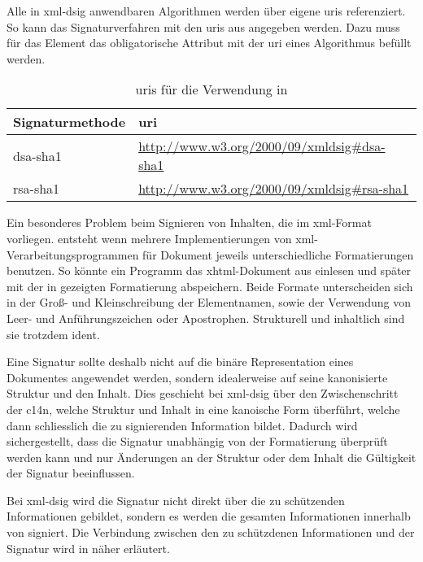 Alle in \gls{xml-dsig} anwendbaren Algorithmen werden über eigene \glspl{uri} referenziert. So kann das Signaturverfahren mit den \glspl{uri} aus
 angegeben werden. Dazu muss für das Element  das obligatorische Attribut
 mit der \gls{uri} eines Algorithmus befüllt werden.

\begin{table}
    \centering
    \begin{tabularx}{\textwidth}{ l X }
        Signaturmethode & \gls{uri} \\
        \hline
        \hline
        \gls{dsa}-\gls{sha1} & \url{http://www.w3.org/2000/09/xmldsig\#dsa-sha1} \\
        \hline
        \gls{rsa}-\gls{sha1} & \url{http://www.w3.org/2000/09/xmldsig\#rsa-sha1} \\
        \hline
    \end{tabularx}
    \caption{\protect\glspl{uri} für die Verwendung in }
    \label{tab:xml-dsig-signature-method-uri}
\end{table}

Ein besonderes Problem beim Signieren von Inhalten, die im \gls{xml}-Format vorliegen. entsteht wenn mehrere Implementierungen von
\gls{xml}-Verarbeitungsprogrammen für Dokument jeweils unterschiedliche Formatierungen benutzen. So könnte ein Programm das \gls{xhtml}-Dokument aus
 einlesen und später mit der in  gezeigten Formatierung abspeichern. Beide Formate unterscheiden sich
in der Groß- und Kleinschreibung der Elementnamen, sowie der Verwendung von Leer- und Anführungszeichen oder Apostrophen. Strukturell und inhaltlich sind sie
trotzdem ident.

Eine Signatur sollte deshalb nicht auf die binäre Representation eines Dokumentes angewendet werden, sondern idealerweise auf seine kanonisierte
Struktur und den Inhalt. Dies geschieht bei \gls{xml-dsig} über den Zwischenschritt der \gls{c14n}, welche Struktur und Inhalt in eine kanoische Form überführt,
welche dann schliesslich die zu signierenden Information bildet. Dadurch wird sichergestellt, dass die Signatur unabhängig von der Formatierung überprüft werden
kann und nur Änderungen an der Struktur oder dem Inhalt die Gültigkeit der Signatur beeinflussen. 

Bei \gls{xml-dsig} wird die Signatur nicht direkt über die zu schützenden Informationen gebildet, sondern es werden die gesamten Informationen innerhalb von
 signiert. Die Verbindung zwischen den zu schützdenen Informationen und der Signatur wird in  näher erläutert.

